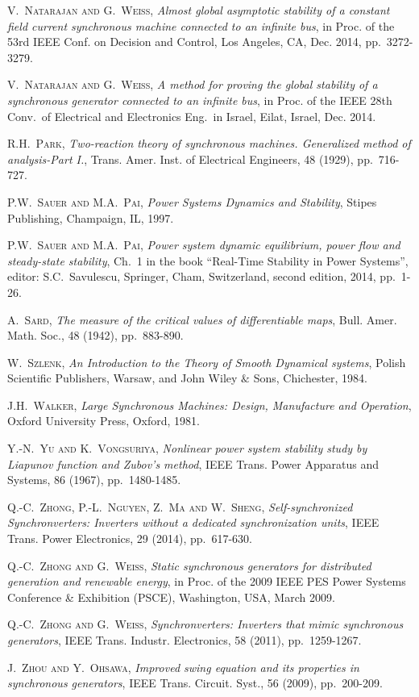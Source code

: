 \documentclass[12pt]{article}
\theoremstyle{definition}
\numberwithin{equation}{section}                        %
\newcommand{\m}      {{\hbox{\hskip 1pt}}}
\begin{document}
\begin{thebibliography}{99}
{
 \textsc{V.~Natarajan and G.~Weiss,} \m {\em Almost global asymptotic
 stability of a constant field current synchronous machine connected
 to an infinite bus}, in Proc. of the 53rd IEEE Conf. on Decision and
 Control, Los Angeles, CA, Dec. 2014, pp.~3272-3279.

 \textsc{V.~Natarajan and G.~Weiss,} \m {\em A method for proving the
 global stability of a synchronous generator connected to an infinite
 bus}, in Proc. of the IEEE 28th Conv.~of Electrical and Electronics
 Eng.~in Israel, Eilat, Israel, Dec. 2014.

 \textsc{R.H.~Park,} \m {\em Two-reaction theory of synchronous
 machines. Generalized method of analysis-Part I.}, Trans. Amer.
 Inst. of Electrical Engineers, 48 (1929), pp.~716-727.

 \textsc{P.W.~Sauer and M.A.~Pai,} \m {\em Power Systems Dynamics and
 Stability}, \m Stipes Publishing, Champaign, IL, 1997.

 \textsc{P.W.~Sauer and M.A.~Pai,} \m {\em Power system dynamic
 equilibrium, power flow and steady-state stability}, Ch.~1 in
 the book ``Real-Time Stability in Power Systems'', editor:
 S.C.~Savulescu, Springer, Cham, Switzerland, second edition,
 2014, pp.~1-26.

 \textsc{A.~Sard,} \m {\em The measure of the critical values of
 differentiable maps}, Bull. Amer. Math. Soc., 48 (1942), pp.~883-890.

 \textsc{W.~Szlenk,} \m {\em An Introduction to the Theory of Smooth
 Dynamical systems}, \m Polish Scientific Publishers, Warsaw, and John
 Wiley $\&$ Sons, Chichester, 1984.

 \textsc{J.H.~Walker,} \m {\em Large Synchronous Machines: Design,
 Manufacture and Operation}, \m Oxford University Press, Oxford, 1981.

 \textsc{Y.-N.~Yu and K.~Vongsuriya,} \m {\em Nonlinear power system
 stability study by Liapunov function and Zubov's method}, IEEE Trans.
 Power Apparatus and Systems, 86 (1967), pp.~1480-1485.

 \textsc{Q.-C.~Zhong, P.-L.~Nguyen, Z.~Ma and W.~Sheng,} \m {\em
 Self-synchronized Synchronverters: Inverters without a dedicated
 synchronization units}, IEEE Trans. Power Electronics, 29 (2014),
 pp.~617-630.

 \textsc{Q.-C.~Zhong and G.~Weiss,} \m {\em Static synchronous
 generators for distributed generation and renewable energy}, in
 Proc. of the 2009 IEEE PES Power Systems Conference \& Exhibition
 (PSCE), Washington, USA, March 2009.

 \textsc{Q.-C.~Zhong and G.~Weiss,} \m {\em Synchronverters: Inverters
 that mimic synchronous generators}, IEEE Trans. Industr. Electronics,
 58 (2011), pp.~1259-1267.

 \textsc{J.~Zhou and Y.~Ohsawa,} \m {\em Improved swing equation and
 its properties in synchronous generators}, IEEE Trans. Circuit. Syst.,
 56 (2009), pp.~200-209.
}
\end{thebibliography}
\end{document}
